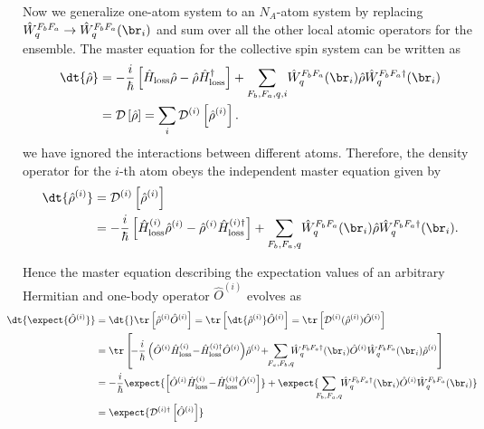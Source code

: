 \documentclass[]{report}
\begin{document}
Now we generalize one-atom system to an $ N_A $-atom system by replacing $\hat{W}_q^{F_bF_a}\rightarrow \hat{W}_q^{F_bF_a}(\br_i)  $ and sum over all the other local atomic operators for the ensemble.
The master equation for the collective spin system can be written as 
\begin{align}
\dt{\hat{\rho}} &= -\frac{i}{\hbar}\left[\hat{H}_{\rm loss}\hat{\rho} -\hat{\rho}\hat{H}_{\rm loss}^\dagger\right] + \sum_{F_b,F_a,q,i}\! \hat{W}_q^{F_bF_a}(\br_i) \hat{\rho} \hat{W}_q^{F_bF_a \dagger}(\br_i) \\
&= \mathcal{D} \left[ \hat{\rho}\right]=\sum_i \mathcal{D}^{(i)} \left[\hat{\rho}^{(i)} \right].
\end{align}
we have ignored the interactions between different atoms. 
Therefore, the density operator for the $ i $-th atom obeys the independent master equation given by
\begin{align}
\dt{\hat{\rho}^{(i)}} &= \mathcal{D}^{(i)} \left[\hat{\rho}^{(i)} \right] \label{eq:drhoidtDi}\\
&= -\frac{i}{\hbar}\left[\hat{H}_{\rm loss}^{(i)} \hat{\rho}^{(i)} -\hat{\rho}^{(i)}\hat{H}_{\rm loss}^{(i)\dagger}\right] + \sum_{F_b,F_a,q}\! \hat{W}_q^{F_bF_a}(\br_i) \hat{\rho} \hat{W}_q^{F_bF_a \dagger}(\br_i).
\end{align}

Hence the master equation describing the expectation values of an arbitrary Hermitian and one-body operator $ \hat{O}^{(i)} $ evolves as
\begin{align}
\!\!\!\!\!\!\!\!\!\! \dt{\expect{\hat{O}^{(i)} }} &= \dt{}\tr\left[\hat{\rho}^{(i)}\hat{O}^{(i)} \right]=\tr\left[\dt{\hat{\rho}^{(i)}}\hat{O}^{(i)} \right]=\tr\left[\mathcal{D}^{(i)}(\hat{\rho}^{(i)})\hat{O}^{(i)} \right]\\
&= \tr\left[\! -\frac{i}{\hbar}\left(\hat{O}^{(i)}\hat{H}_{\rm loss}^{(i)}\!-\! \hat{H}_{\rm loss}^{(i)\dagger}\hat{O}^{(i)}  \right)\!\hat{\rho}^{(i)} \!+\! \!\sum_{F_a,F_b,q} \!\! \!\hat{W}_q^{F_bF_a\dagger}(\br_i) \hat{O}^{(i)} \hat{W}_q^{F_bF_a}(\br_i)\hat{\rho}^{(i)} \right]\\
&=-\frac{i}{\hbar}\expect{\left[\hat{O}^{(i)}\hat{H}_{\rm loss}^{(i)} \!-\! \hat{H}_{\rm loss}^{(i)\dagger}\hat{O}^{(i)}\right]}+ \expect{\!\!\sum_{F_b,F_a,q}\!\! \hat{W}_q^{F_bF_a\dagger}(\br_i) \hat{O}^{(i)} \hat{W}_q^{F_bF_a}(\br_i) }\\
&= \expect{\mathcal{D}^{(i)\dagger}\left[\hat{O}^{(i)} \right] }
\end{align}
\end{document}
